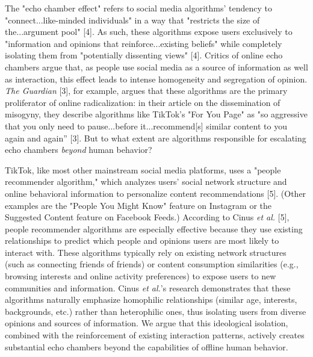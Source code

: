 \documentclass[10pt]{article}
\begin{document}
The "echo chamber effect" refers to social media algorithms' tendency to "connect...like-minded individuals" in a way that "restricts the size of the...argument pool" [4]. As such, these algorithms expose users exclusively to "information and opinions that reinforce...existing beliefs" while completely isolating them from "potentially dissenting views" [4]. Critics of online echo chambers argue that, as people use social media as a source of information as well as interaction, this effect leads to intense homogeneity and segregation of opinion. \textit{The Guardian} [3], for example, argues that these algorithms are the primary proliferator of online radicalization: in their article on the dissemination of misogyny, they describe algorithms like TikTok's "For You Page" as "so aggressive that you only need to pause...before it...recommend[s] similar content to you again and again” [3]. But to what extent are algorithms responsible for escalating echo chambers \textit{beyond} human behavior?

TikTok, like most other mainstream social media platforms, uses a "people recommender algorithm," which analyzes users' social network structure and online behavioral information to personalize content recommendations [5]. (Other examples are the "People You Might Know" feature on Instagram or the Suggested Content feature on Facebook Feeds.) According to Cinus \textit{et al.} [5], people recommender algorithms are especially effective because they use existing relationships to predict which people and opinions users are most likely to interact with. These algorithms typically rely on existing network structures (such as connecting friends of friends) or content consumption similarities (e.g., browsing interests and online activity preferences) to expose users to new communities and information. Cinus \textit{et al.}'s research demonstrates that these algorithms naturally emphasize homophilic relationships (similar age, interests, backgrounds, etc.) rather than heterophilic ones, thus isolating users from diverse opinions and sources of information. We argue that this ideological isolation, combined with the reinforcement of existing interaction patterns, actively creates substantial echo chambers beyond the capabilities of offline human behavior. 
\end{document}

